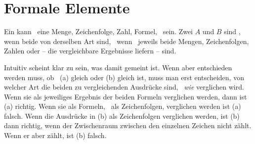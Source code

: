 \section{Formale Elemente}%
\label{sec:Formalelement}

Ein \emph{} kann \textzB\ eine Menge, Zeichenfolge, Zahl, Formel, \textusw\ sein.
Zwei  $A$ und $B$ sind \emph{}, wenn beide von derselben Art sind, \textdh\ wenn \textzB\ jeweils beide Mengen, Zeichenfolgen, Zahlen oder  -- die vergleichbare Ergebnisse liefern -- sind.

Intuitiv scheint klar zu sein, was damit  gemeint ist.
Wenn aber entschieden werden muss, ob \textzB\ (a)  gleich  oder (b)  gleich  ist, muss man erst entscheiden, von welcher Art die beiden zu vergleichenden Ausdrücke sind, \textdh\ \emph{wie} verglichen wird.
Wenn sie als jeweiliges Ergebnis der beiden Formeln verglichen werden, dann ist (a) richtig.
Wenn sie als Formeln, \textdh\ als Zeichenfolgen, verglichen werden ist (a) falsch.
Wenn die Ausdrücke in (b) als Zeichenfolgen verglichen werden, ist (b) dann richtig, wenn der Zwischenraum zwischen den einzelnen Zeichen nicht zählt.
Wenn er aber zählt, ist (b) falsch.

